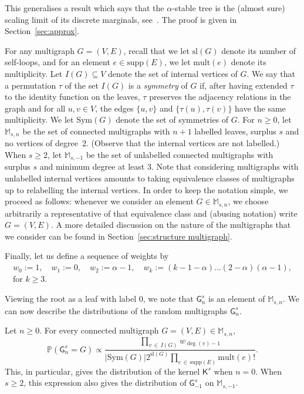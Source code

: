 \documentclass[AHL,Unicode,longabstracts,published]{cedram}
\newcommand{\abs}[1]{\left\lvert#1\right\rvert}
\newcommand{\Pp}[1]{\mathbb{P} \left(#1\right)}
\renewcommand{\subset}{\subseteq}
\newcommand{\supp}{\mathrm{supp}}
\newcommand{\sll}{\mathrm{sl}}
\newcommand{\Sym}{\mathrm{Sym}}
\newcommand{\mult}{\mathrm{mult}}
\newcommand{\sG}{\mathsf{G}}
\newcommand{\sK}{\mathsf{K}}
\newcommand{\M}{\mathbb{M}}
\begin{document}
This generalises a result which says that the $\alpha$-stable tree is the (almost sure) scaling limit of its discrete marginals, see~\cite{CurienHaas,Marchal}. The proof is given in Section~\ref{sec:approx}.

For any multigraph $G=(V,E)$, recall that we let $\sll(G)$ denote its number of self-loops, and for an element $e \in \supp(E)$, we let $\mult(e)$ denote its multiplicity. Let $I(G) \subset V$ denote the set of internal vertices of $G$. We say that a permutation $\tau$ of the set $I(G)$ is a \emph{symmetry} of $G$ if, after having extended $\tau$ to the identity function on the leaves, $\tau$ preserves the adjacency relations in the graph and for all $u,v \in V$, the edges $\{u,v\}$ and $\{\tau(u),\tau(v)\}$ have the same multiplicity. We let $\Sym(G)$ denote the set of symmetries of $G$. For $n \ge 0$, let $\M_{s,n}$ be the set of connected multigraphs with $n+1$ labelled leaves, surplus $s$ and no vertices of degree~2. (Observe that the internal vertices are not labelled.) When $s\geq 2$, let $\M_{s,-1}$ be the set of unlabelled connected multigraphs with surplus $s$ and minimum degree at least 3. Note that considering multigraphs with unlabelled internal vertices amounts to taking equivalence classes of multigraphs up to relabelling the internal vertices. In order to keep the notation simple, we proceed as follows: whenever we consider an element $G\in \M_{s,n}$, we choose arbitrarily a representative of that equivalence class and (abusing notation) write $G=(V,E)$. A more detailed discussion on the nature of the multigraphs that we consider can be found in Section~\ref{sec:structure multigraph}.

Finally, let us define a sequence of weights by
\begin{multline}\label{Marchal's weights}
w_0:=1, \quad w_1:=0, \quad w_2:=\alpha-1,\quad w_k:=(k-1-\alpha)\dots(2-\alpha)(\alpha-1), \\ \text{for }k\geq 3.
\end{multline}


Viewing the root as a leaf with label $0$, we note that $\sG_{n}^s$ is an element of $\M_{s,n}$. We can now describe the distributions of the random multigraphs $\sG_{n}^s$.

\begin{theo}\label{th:distr_marginals}
Let $n\geq0$. For every connected multigraph $G=(V,E) \in \M_{s,n}$,
\[
\Pp{\sG_{n}^s=G}\propto\frac{\prod\limits_{v\,\in\,I(G)} w_{\deg(v)-1}}{\abs{\Sym(G)}2^{\sll(G)}\prod\limits_{e\,\in\,\supp(E)}\mult(e)!}.
\]
This, in particular, gives the distribution of the kernel $\sK^s$ when $n=0$. When $s\geq 2$, this expression also gives the distribution of $\sG_{-1}^s$ on $\M_{s,-1}$.
\end{theo}
\end{document}
